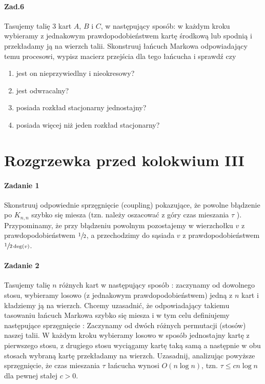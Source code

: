 \documentclass[a4paper,12pt]{article}
\theoremstyle{definition}%
\theoremstyle{definition}
\theoremstyle{problem}
\begin{document}
\paragraph{Zad.6} Tasujemy talię 3 kart $A$, $B$ i $C$, w następujący sposób: w każdym kroku wybieramy z jednakowym prawdopodobieństwem kartę środkową lub spodnią i przekładamy ją na wierzch talii. Skonstruuj łańcuch Markowa odpowiadający temu procesowi, wypisz macierz przejścia dla tego łańcucha i sprawdź czy
\begin{enumerate}[label=\alph*)]
\item jest on nieprzywiedlny i nieokresowy?
\item jest odwracalny?
\item posiada rozkład stacjonarny jednostajny?
\item posiada więcej niż jeden rozkład stacjonarny?
\end{enumerate}

\section{Rozgrzewka przed kolokwium III}
\paragraph{Zadanie 1} Skonstruuj odpowiednie sprzęgnięcie (coupling) pokazujące, że powolne błądzenie po $K_{n,n}$ szybko się miesza (tzn. należy oszacować z góry czas mieszania $\tau$ ). Przypominamy, że przy błądzeniu powolnym pozostajemy w wierzchołku $v$ z prawdopodobieństwem $\sfrac{1}{2}$, a przechodzimy do sąsiada $v$ z prawdopodobieństwem $\sfrac{1}{2\deg (v)}$.

\paragraph{Zadanie 2} Tasujemy talię $n$ różnych kart w następujący sposób : zaczynamy od dowolnego stosu, wybieramy losowo (z jednakowym prawdopodobieństwem) jedną z $n$ kart i kładziemy ją na wierzch. Chcemy uzasadnić, że odpowiadający takiemu tasowaniu łańcuch Markowa szybko się miesza i w tym celu definiujemy następujące sprzęgnięcie : Zaczynamy od dwóch różnych permutacji (stosów) naszej talii. W każdym kroku wybieramy losowo w sposób jednostajny kartę z pierwszego stosu, z drugiego stosu wyciągamy kartę taką samą a następnie w obu stosach wybraną kartę przekładamy na wierzch. Uzasadnij, analizując powyższe sprzęgnięcie, że czas mieszania $\tau$ łańcucha wynosi $O(n \log n)$, tzn. $\tau \leq cn \log n$ dla pewnej stałej $c > 0$.
\end{document}
